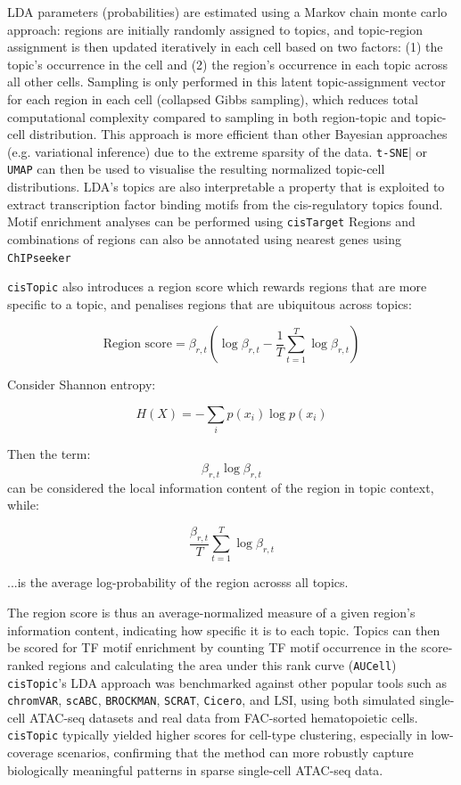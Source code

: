 LDA parameters (probabilities) are estimated using a Markov chain monte carlo approach: regions are initially randomly assigned to topics, and topic-region assignment is then updated iteratively in each cell based on two factors: (1) the topic's occurrence in the cell and (2) the region's occurrence in each topic across all other cells. Sampling is only performed in this latent topic-assignment vector for each region in each cell (collapsed Gibbs sampling), which reduces total computational complexity compared to sampling in both region-topic and topic-cell distribution. This approach is more efficient than other Bayesian approaches (e.g. variational inference) due to the extreme sparsity of the data. \verb|t-SNE|| or \verb|UMAP| can then be used to visualise the resulting normalized topic-cell distributions. LDA's topics are also interpretable a property that is exploited to extract transcription factor binding motifs from the cis-regulatory topics found. Motif enrichment analyses can be performed using \verb|cisTarget| Regions and combinations of regions can also be annotated using nearest genes using \verb|ChIPseeker|

\verb|cisTopic| also introduces a region score which rewards regions that are more specific to a topic, and penalises regions that are ubiquitous across topics:

\[
	\text{Region score} = \beta_{r,t} \left( \log \beta_{r,t} - \frac{1}{T} \sum_{t=1}^{T} \log \beta_{r,t} \right)
\]

\begin{center}
	Consider Shannon entropy:

	\[H(X) = -\sum_{i} p(x_i) \log p(x_i)\]

	Then the term: \[\beta_{r,t} \log \beta_{r,t}\] can be considered the local information content of the region in topic context, while:

	\[\frac{\beta_{r,t}}{T} \sum_{t=1}^{T} \log \beta_{r,t}\]

	...is the average log-probability of the region acrosss all topics.
\end{center}

The region score is thus an average-normalized measure of a given region's information content, indicating how specific it is to each topic. Topics can then be scored for TF motif enrichment by counting TF motif occurrence in the score-ranked regions and calculating the area under this rank curve (\verb|AUCell|) \verb|cisTopic|'s LDA approach was benchmarked against other popular tools such as \verb|chromVAR|, \verb|scABC|, \verb|BROCKMAN|, \verb|SCRAT|, \verb|Cicero|, and LSI, using both simulated single-cell ATAC-seq datasets and real data from FAC-sorted hematopoietic cells. \verb|cisTopic| typically yielded higher scores for cell-type clustering, especially in low-coverage scenarios, confirming that the method can more robustly capture biologically meaningful patterns in sparse single-cell ATAC-seq data.

